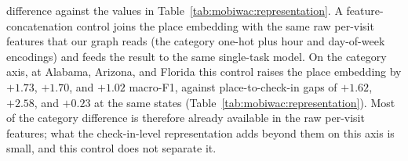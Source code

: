 difference against the values in Table~\ref{tab:mobiwac:representation}. A feature-concatenation control joins the place embedding with the same raw
per-visit features that our graph reads (the category one-hot plus hour and
day-of-week encodings) and feeds the result to the same single-task model. On
the category axis, at Alabama, Arizona, and Florida this control raises the
place embedding by $+1.73$, $+1.70$, and $+1.02$ macro-F1, against
place-to-check-in gaps of $+1.62$, $+2.58$, and $+0.23$ at the same states
(Table~\ref{tab:mobiwac:representation}). Most of the category difference is
therefore already available in the raw per-visit features; what the
check-in-level representation adds beyond them on this axis is small, and this
control does not separate it.

